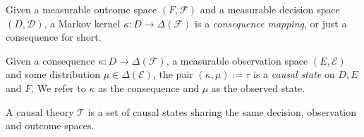 \begin{definition}[Consequences]
Given a measurable outcome space $(F,\mathcal{F})$ and a measurable decision space $(D,\mathcal{D})$, a Markov kernel $\kappa:D \to \Delta(\mathcal{F})$ is a \emph{consequence mapping}, or just a consequence for short.
\end{definition}

\begin{definition}
Given a consequence $\kappa:D\to \Delta(\mathcal{F})$, a measurable observation space $(E,\mathcal{E})$ and some distribution $\mu\in \Delta(\mathcal{E})$, the pair $(\kappa,\mu):=\tau$ is a \emph{causal state} on $D, E$ and $F$. We refer to $\kappa$ as the consequence and $\mu$ as the observed state.
\end{definition}

\begin{definition}\label{def:causal_theory}
A causal theory $\mathscr{T}$ is a set of causal states sharing the same decision, observation and outcome spaces. 
\end{definition}



